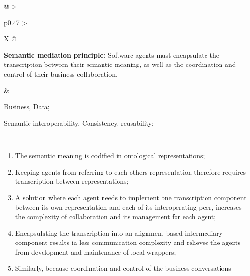\begin{xltabular}[l]{\linewidth}{@{} >{\small\raggedright\arraybackslash}p{0.47\linewidth} >{\small\raggedright\arraybackslash}X @{}}
%
%
%
\begin{mmdp}\label{dp:smep}{\bfseries Semantic mediation principle:}
\quad Software agents must encapsulate the transcription between their semantic meaning, as well as the coordination and control of their business collaboration.\end{mmdp}
&
\begin{description}[labelwidth=3.7cm,leftmargin=3.7cm+1ex,nosep,topsep=2ex,labelsep=1ex,font=\bfseries]
\item[Type of information:] Business, Data;
\item[Quality attributes:] Semantic interoperability, Consistency, reusability;
\end{description} \\
\begin{enumerate}[left=6pt, nosep]
  \item The semantic meaning is codified in ontological representations;
  \item Keeping agents from referring to each others representation therefore requires transcription between representations;
  \item A solution where each agent needs to implement one transcription component between its own representation and each of its interoperating peer, increases the complexity of collaboration and its management for each agent;
  \item Encapsulating the transcription into an alignment-based intermediary component results in less communication complexity and relieves the agents from development and maintenance of local wrappers;
  \item Similarly, because coordination and control of the business conversations
  \begin{enumerate}

\end{enumerate}
\end{enumerate}
\end{xltabular}
